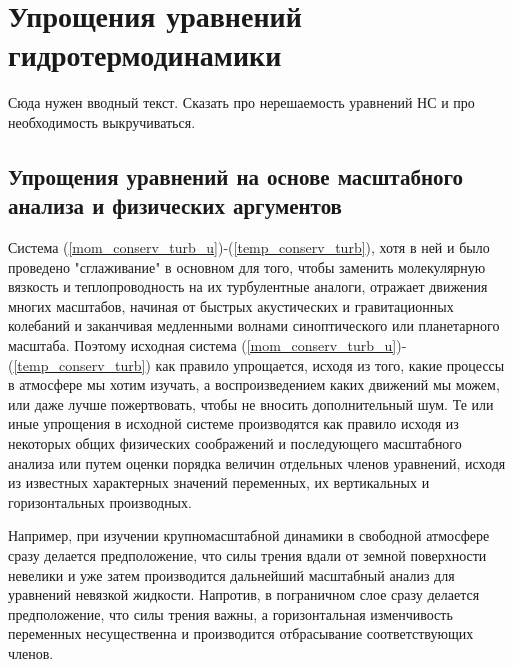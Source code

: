 \chapter{{\color{done}Упрощения уравнений гидротермодинамики}}
    \begin{warn}
    Сюда нужен вводный текст. Сказать про нерешаемость уравнений НС и про необходимость выкручиваться. 
    \end{warn}

\section{{\color{done}Упрощения уравнений на основе масштабного анализа и физических аргументов}} \label{ch4.1}

Система (\ref{mom_conserv_turb_u})-(\ref{temp_conserv_turb}), хотя в ней и было проведено "сглаживание" в основном для того, чтобы заменить молекулярную вязкость и теплопроводность на их турбулентные аналоги, отражает движения многих масштабов, начиная от быстрых акустических и гравитационных колебаний и заканчивая медленными волнами синоптического или планетарного масштаба. Поэтому исходная система (\ref{mom_conserv_turb_u})-(\ref{temp_conserv_turb}) как правило упрощается, исходя из того, какие процессы в атмосфере мы хотим изучать, а воспроизведением каких движений мы можем, или даже лучше пожертвовать, чтобы не вносить дополнительный шум. Те или иные упрощения в исходной системе производятся как правило исходя из некоторых общих физических соображений и последующего масштабного анализа или путем оценки порядка величин отдельных членов уравнений, исходя из известных характерных значений переменных, их вертикальных и горизонтальных производных.

Например, при изучении крупномасштабной динамики в свободной атмосфере сразу делается предположение, что силы трения вдали от земной поверхности невелики и уже затем производится дальнейший масштабный анализ для уравнений невязкой жидкости. Напротив, в пограничном слое сразу делается предположение, что силы трения важны, а горизонтальная изменчивость переменных несущественна и производится отбрасывание соответствующих членов.

